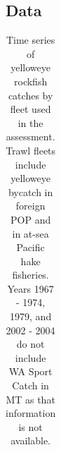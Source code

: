 \documentclass[
]{scrartcl}
\begin{document}
\endgroup

\newpage{}

\subsection{Data}\label{data-1}

\begingroup
\fontsize{9.0pt}{10.8pt}\selectfont

\begin{longtable}{rrrrrrrrrr}

\caption{\label{tbl-all_removals}Time series of yelloweye rockfish
catches by fleet used in the assessment. Trawl fleets include yelloweye
bycatch in foreign POP and in at-sea Pacific hake fisheries. Years 1967
- 1974, 1979, and 2002 - 2004 do not include WA Sport Catch in MT as
that information is not available.}

\tabularnewline


\end{longtable}
\end{document}
